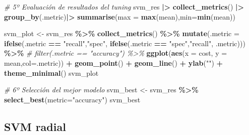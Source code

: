 \documentclass[12pt,a4paper,]{book}
\newenvironment{Shaded}{\begin{snugshade}}{\end{snugshade}}
\newcommand{\AttributeTok}[1]{\textcolor[rgb]{0.13,0.29,0.53}{#1}}
\newcommand{\CommentTok}[1]{\textcolor[rgb]{0.56,0.35,0.01}{\textit{#1}}}
\newcommand{\FunctionTok}[1]{\textcolor[rgb]{0.13,0.29,0.53}{\textbf{#1}}}
\newcommand{\NormalTok}[1]{#1}
\newcommand{\OtherTok}[1]{\textcolor[rgb]{0.56,0.35,0.01}{#1}}
\newcommand{\SpecialCharTok}[1]{\textcolor[rgb]{0.81,0.36,0.00}{\textbf{#1}}}
\newcommand{\StringTok}[1]{\textcolor[rgb]{0.31,0.60,0.02}{#1}}
\numberwithin{dummy}{section}
\theoremstyle{ocrenumbox}
\theoremstyle{blacknumex}
\theoremstyle{blacknumbox}
\theoremstyle{ocrenum}
\theoremstyle{ocrenum}
\begin{document}
\begin{Shaded}
\begin{Highlighting}[]
\CommentTok{\# 5º Evaluación de resultados del tuning}
\NormalTok{svm\_res }\SpecialCharTok{|\textgreater{}} 
  \FunctionTok{collect\_metrics}\NormalTok{() }\SpecialCharTok{|\textgreater{}} 
  \FunctionTok{group\_by}\NormalTok{(.metric)}\SpecialCharTok{|\textgreater{}} 
  \FunctionTok{summarise}\NormalTok{(}\AttributeTok{max =} \FunctionTok{max}\NormalTok{(mean),}\AttributeTok{min=}\FunctionTok{min}\NormalTok{(mean))}

\NormalTok{svm\_plot }\OtherTok{\textless{}{-}} 
\NormalTok{  svm\_res }\SpecialCharTok{\%\textgreater{}\%} 
  \FunctionTok{collect\_metrics}\NormalTok{() }\SpecialCharTok{\%\textgreater{}\%}  
  \FunctionTok{mutate}\NormalTok{(}\AttributeTok{.metric =} \FunctionTok{ifelse}\NormalTok{(.metric }\SpecialCharTok{==} \StringTok{"recall"}\NormalTok{,}\StringTok{"spec"}\NormalTok{,}
                          \FunctionTok{ifelse}\NormalTok{(.metric }\SpecialCharTok{==} \StringTok{"spec"}\NormalTok{,}\StringTok{"recall"}\NormalTok{,}
\NormalTok{                                 .metric))) }\SpecialCharTok{\%\textgreater{}\%} 
  \CommentTok{\# filter(.metric == "accuracy") \%\textgreater{}\%}
  \FunctionTok{ggplot}\NormalTok{(}\FunctionTok{aes}\NormalTok{(}\AttributeTok{x =}\NormalTok{ cost, }\AttributeTok{y =}\NormalTok{ mean,}\AttributeTok{col=}\NormalTok{.metric)) }\SpecialCharTok{+} 
  \FunctionTok{geom\_point}\NormalTok{() }\SpecialCharTok{+} 
  \FunctionTok{geom\_line}\NormalTok{() }\SpecialCharTok{+} 
  \FunctionTok{ylab}\NormalTok{(}\StringTok{""}\NormalTok{) }\SpecialCharTok{+}
  \FunctionTok{theme\_minimal}\NormalTok{()}
\NormalTok{svm\_plot}

\CommentTok{\# 6º Selección del mejor modelo}
\NormalTok{svm\_best }\OtherTok{\textless{}{-}} 
\NormalTok{  svm\_res }\SpecialCharTok{\%\textgreater{}\%} 
  \FunctionTok{select\_best}\NormalTok{(}\AttributeTok{metric=}\StringTok{"accuracy"}\NormalTok{)}
\NormalTok{svm\_best}
\end{Highlighting}
\end{Shaded}

\hypertarget{svm-radial-1}{%
\subsection{SVM radial}\label{svm-radial-1}}
\end{document}
